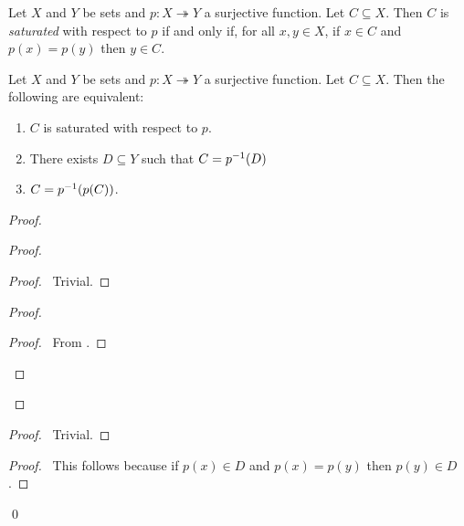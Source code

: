 \begin{definition}
    Let $X$ and $Y$ be sets and $p : X \twoheadrightarrow Y$ a surjective function. Let $C \subseteq X$. Then $C$ is \emph{saturated} with respect to $p$ if and only if, for all
    $x, y \in X$, if $x \in C$ and $p(x) = p(y)$ then $y \in C$.
\end{definition}

\begin{proposition}
    \label{proposition:saturated}
    Let $X$ and $Y$ be sets and $p : X \twoheadrightarrow Y$ a surjective function. Let $C \subseteq X$. Then the following are equivalent:
    \begin{enumerate}
        \item $C$ is saturated with respect to $p$.
        \item There exists $D \subseteq Y$ such that $C = {p}^{-1}(D)$
        \item $C = {p}^{-1}(p(C))$.
    \end{enumerate}
\end{proposition}

\begin{proof}
    \pf
    \begin{proof}
        \begin{proof}
            \pf\ Trivial.
        \end{proof}
        \begin{proof}
            \begin{proof}
                \pf\ From .
            \end{proof}
        \end{proof}
    \end{proof}
    \begin{proof}
        \pf\ Trivial.
    \end{proof}
    \begin{proof}
        \pf\ This follows because if $p(x) \in D$ and $p(x) = p(y)$ then $p(y) \in D$.
    \end{proof}
    \qed
\end{proof}

